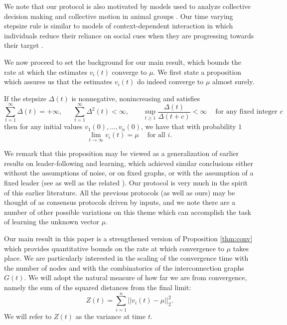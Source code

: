 \documentclass[final]{siamltex}
\begin{document}
We note that our protocol is also motivated by models used to analyze collective decision making and collective motion in animal groups \cite{c05,lsnscl12}.  Our time varying stepsize rule is similar to models of context-dependent interaction in which individuals reduce their reliance on social cues when they are progressing towards their target \cite{tnc09}.

 We now proceed to set the background for our main result, which bounds the rate at which the estimates $v_i(t)$ converge to $\mu$. We first state a proposition which assures us that the estimates $v_i(t)$ do indeed converge to $\mu$ almost surely. 

\bigskip

\begin{proposition} \label{thm:conv} If the stepsize $\Delta(t)$ is nonnegative, nonincreasing and satisfies 
\[ \sum_{t=1}^{\infty} \Delta(t) = +\infty, ~~~~~~~ \sum_{t=1}^{\infty} \Delta^2(t) < \infty,  ~~~~~~~~~ \sup_{t \geq 1} \frac{\Delta(t)}{\Delta(t+c)} < \infty ~~~~ \mbox{ for any fixed integer } c \] then for any initial values
$v_1(0), \ldots, v_n(0)$, we have that with probability $1$ \[ \lim_{t \rightarrow \infty} v_i(t) = \mu ~~~~ \mbox{ for all } i. \]
\end{proposition}

We remark that this proposition may be viewed as a generalization of earlier results on leader-following and learning, which achieved similar conclusions either without the
assumptions of noise, or on fixed graphs, or with the assumption of a fixed leader (see \cite{jlm, leader1, leader2, leader3, angelia-asu-learn, bfh, moura7} as well as the related \cite{hj, carli2}). Our protocol is very much in the spirit of this earlier literature. All the previous protocols (as well as ours) may be thought of as consensus protocols driven by inputs, and we note there are a number of other possible variations on this 
theme which can accomplish the task of learning the unknown vector $\mu$.  

{{{Our main result in this paper is a strengthened version of {{{Proposition}}} \ref{thm:conv} which  provides quantitative bounds on the rate at which convergence to $\mu$ takes place. We are particularly interested in the scaling of the convergence time with the number of nodes and with the combinatorics of the interconnection graphs $G(t)$. We will adopt the natural measure of how far we are from convergence, namely}}} the sum of the squared distances from the final limit:  \[ Z({{{t}}}) = \sum_{i=1}^n ||v_i(t) - \mu||_2^2. \] We will refer to $Z(t)$ as the variance at time $t$. 
\end{document}
